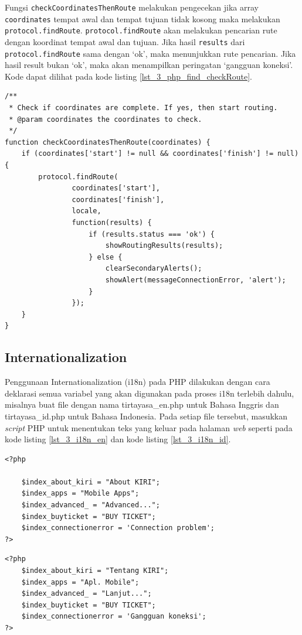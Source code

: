 Fungsi \verb!checkCoordinatesThenRoute! melakukan pengecekan jika array \verb!coordinates! tempat awal dan tempat tujuan tidak kosong maka melakukan \verb!protocol.findRoute!. \verb!protocol.findRoute! akan melakukan pencarian rute dengan koordinat tempat awal dan tujuan. Jika hasil \verb!results! dari \verb!protocol.findRoute! sama dengan `ok', maka menunjukkan rute pencarian. Jika hasil result bukan `ok', maka akan menampilkan peringatan `gangguan koneksi'. Kode dapat dilihat pada kode listing \ref{lst_3_php_find_checkRoute}.
\begin{lstlisting}[caption=Fungsi JavaScript checkCoordinatesThenRoute,label = {lst_3_php_find_checkRoute}]
/**
 * Check if coordinates are complete. If yes, then start routing.
 * @param coordinates the coordinates to check.
 */
function checkCoordinatesThenRoute(coordinates) {
	if (coordinates['start'] != null && coordinates['finish'] != null) {
		protocol.findRoute(
				coordinates['start'],
				coordinates['finish'],
				locale,
				function(results) {
					if (results.status === 'ok') {
						showRoutingResults(results);
					} else {
						clearSecondaryAlerts();
						showAlert(messageConnectionError, 'alert');
					}
				});
	}
}
\end{lstlisting}

\subsection{Internationalization}
Penggunaan Internationalization (i18n) pada PHP dilakukan dengan cara deklarasi semua variabel yang akan digunakan pada proses i18n terlebih dahulu, misalnya buat file dengan nama tirtayasa\_en.php untuk Bahasa Inggris dan tirtayasa\_id.php untuk Bahasa Indonesia. Pada setiap file tersebut, masukkan \textit{script} PHP untuk menentukan teks yang keluar pada halaman \textit{web} seperti pada kode listing \ref{lst_3_i18n_en} dan kode listing \ref{lst_3_i18n_id}. 

\begin{lstlisting}[caption=Script PHP untuk Bahasa Inggris,label = {lst_3_i18n_en}]
<?php

	$index_about_kiri = "About KIRI";
	$index_apps = "Mobile Apps";
	$index_advanced_ = "Advanced...";
	$index_buyticket = "BUY TICKET";
	$index_connectionerror = 'Connection problem';
?>
\end{lstlisting}


\begin{lstlisting}[caption=Script PHP untuk Bahasa Indonesia,label = {lst_3_i18n_id}]
<?php
	$index_about_kiri = "Tentang KIRI";
	$index_apps = "Apl. Mobile";
	$index_advanced_ = "Lanjut...";
	$index_buyticket = "BUY TICKET";
	$index_connectionerror = 'Gangguan koneksi';
?>
\end{lstlisting}

